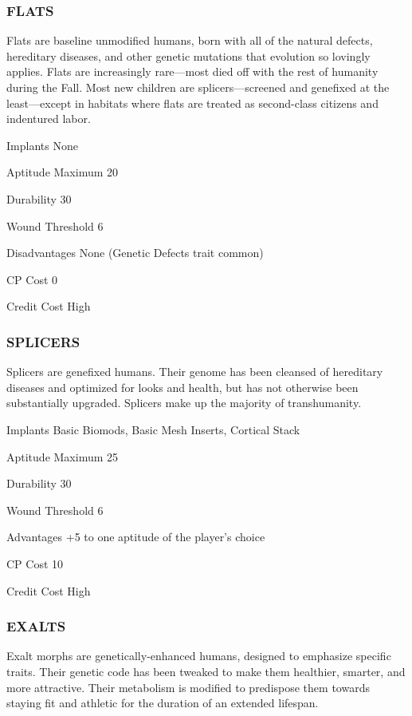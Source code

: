 \subsubsection{FLATS}
Flats are baseline unmodified humans, born with all of the natural defects,
hereditary diseases, and other genetic mutations that evolution so lovingly
applies.  Flats are increasingly rare—most died off with the rest of humanity
during the Fall. Most new children are splicers—screened and genefixed at the
least—except in habitats where flats are treated as second-class citizens and
indentured labor.

\begin{description*}
\item[Implants] None
\item[Aptitude Maximum] 20
\item[Durability] 30
\item[Wound Threshold] 6
\item[Disadvantages] None (Genetic Defects trait common)
\item[CP Cost] 0
\item[Credit Cost] High
\end{description*}

\subsubsection{SPLICERS}
Splicers are genefixed humans. Their genome has been cleansed of hereditary
diseases and optimized for looks and health, but has not otherwise been
substantially upgraded. Splicers make up the majority of transhumanity.

\begin{description*}
\item[Implants] Basic Biomods, Basic Mesh Inserts, Cortical Stack
\item[Aptitude Maximum] 25
\item[Durability] 30
\item[Wound Threshold] 6
\item[Advantages] +5 to one aptitude of the player’s choice
\item[CP Cost] 10
\item[Credit Cost] High
\end{description*}

\subsubsection{EXALTS}
Exalt morphs are genetically-enhanced humans, designed to emphasize specific
traits. Their genetic code has been tweaked to make them healthier, smarter,
and more attractive. Their metabolism is modified to predispose them towards
staying fit and athletic for the duration of an extended lifespan.

